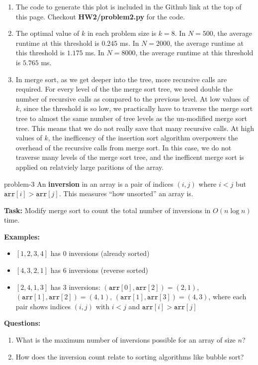 \documentclass[letterpaper, 11pt]{extarticle}
\begin{document}
\begin{enumerate}
    \item The code to generate this plot is included in the Github link at the top of this page. Checkout \textbf{HW2/problem2.py} for the code.
    \item The optimal value of $k$ in each problem size is $k=8$. In $N=500$, the average runtime at this threshold is $0.245$ ms. In $N=2000$, the average runtime at this threshold is $1.175$ ms. In $N=8000$, the average runtime at this threshold is $5.765$ ms.
    \item In merge sort, as we get deeper into the tree, more recursive calls are required. For every level of the the merge sort tree, we need double the number of recursive calls as compared to the previous level. At low values of $k$, since the threshold is so low, we practically have to traverse the merge sort tree to almost the same number of tree levels as the un-modified merge sort tree. This means that we do not really save that many recursive calls. At high values of $k$, the inefficency of the insertion sort algorithm overpowers the overhead of the recursive calls from merge sort. In this case, we do not traverse many levels of the merge sort tree, and the inefficent merge sort is applied on relatviely large paritions of the array.
\end{enumerate}


\begin{problem}{}{problem-3}
    An \textbf{inversion} in an array is a pair of indices $(i, j)$ where $i < j$ but $\texttt{arr}[i] > \texttt{arr}[j]$. This measures ``how unsorted'' an array is.

    \vspace{1ex}
    \noindent\textbf{Task:} Modify merge sort to count the total number of inversions in $O(n \log n)$ time.

    \vspace{1ex}
    \noindent\textbf{Examples:}
    \begin{itemize}
        \item $[1, 2, 3, 4]$ has 0 inversions (already sorted)
        \item $[4, 3, 2, 1]$ has 6 inversions (reverse sorted)
        \item $[2, 4, 1, 3]$ has 3 inversions: $(\texttt{arr}[0], \texttt{arr}[2]) = (2,1)$, $(\texttt{arr}[1], \texttt{arr}[2]) = (4,1)$, $(\texttt{arr}[1], \texttt{arr}[3]) = (4,3)$, where each pair shows indices $(i,j)$ with $i < j$ and $\texttt{arr}[i] > \texttt{arr}[j]$
    \end{itemize}

    \vspace{1ex}
    \noindent\textbf{Questions:}
    \begin{enumerate}
        \item What is the maximum number of inversions possible for an array of size $n$?
        \item How does the inversion count relate to sorting algorithms like bubble sort?
    \end{enumerate}

\end{problem}
\end{document}
